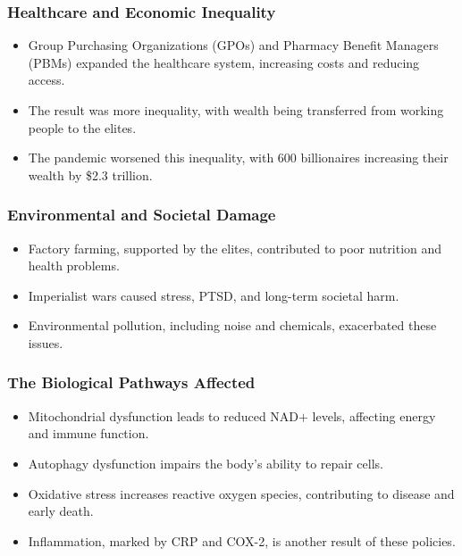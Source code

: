 \begin{frame}[fragile]\frametitle{Healthcare and Economic Inequality}
      \begin{itemize}
          \item Group Purchasing Organizations (GPOs) and Pharmacy Benefit Managers (PBMs) expanded the healthcare system, increasing costs and reducing access.
          \item The result was more inequality, with wealth being transferred from working people to the elites.
          \item The pandemic worsened this inequality, with 600 billionaires increasing their wealth by \$2.3 trillion.
      \end{itemize}
\end{frame}

\begin{frame}[fragile]\frametitle{Environmental and Societal Damage}
      \begin{itemize}
          \item Factory farming, supported by the elites, contributed to poor nutrition and health problems.
          \item Imperialist wars caused stress, PTSD, and long-term societal harm.
          \item Environmental pollution, including noise and chemicals, exacerbated these issues.
      \end{itemize}
\end{frame}

\begin{frame}[fragile]\frametitle{The Biological Pathways Affected}
      \begin{itemize}
          \item Mitochondrial dysfunction leads to reduced NAD$+$ levels, affecting energy and immune function.
          \item Autophagy dysfunction impairs the body’s ability to repair cells.
          \item Oxidative stress increases reactive oxygen species, contributing to disease and early death.
          \item Inflammation, marked by CRP and COX-2, is another result of these policies.
      \end{itemize}
\end{frame}

